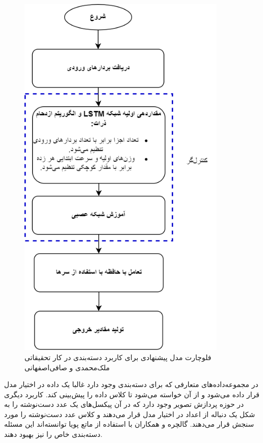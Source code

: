 \begin{figure}[!h]
\begin{center}
\includegraphics[height=18cm]{PSO-NTM.png}
\end{center}
\caption{فلوچارت مدل پیشنهادی برای کاربرد دسته‌بندی در کار تحقیقاتی ملک‌محمدی و صافی‌اصفهانی \cite{faradonbe2020classifier}} 
\end{figure}

در مجموعه‌داده‌های متعارفی که برای دسته‌بندی وجود دارد غالبا یک داده در اختیار مدل قرار داده می‌شود و از آن خواسته می‌شود تا کلاس داده را پیش‌بینی کند. کاربرد دیگری در حوزه پردازش تصویر وجود دارد که در آن پیکسل‌های یک عدد دست‌نوشته را به شکل یک دنباله از اعداد در اختیار مدل قرار می‌دهند و کلاس عدد دست‌نوشته را مورد سنجش قرار می‌دهند. گالچره و همکاران با استفاده از ماتع پویا توانسته‌اند این مسئله دسته‌بندی خاص را نیز بهبود دهند.\cite{gulcehre2018dynamic}


